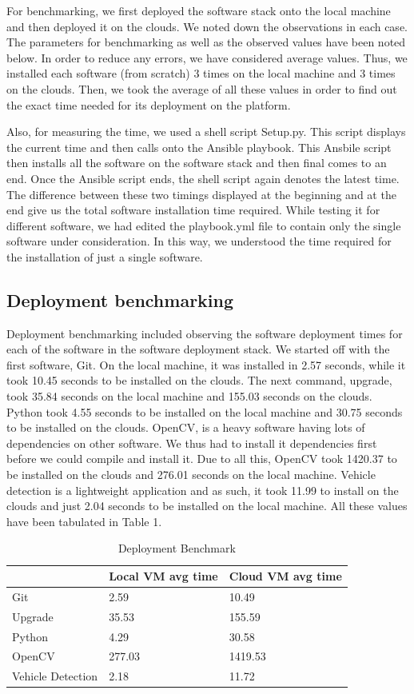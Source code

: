 \documentclass[9pt,twocolumn,twoside]{../../styles/osajnl}
\begin{document}
For benchmarking, we first deployed the software stack onto the local
machine and then deployed it on the clouds.  We noted down the
observations in each case.  The parameters for benchmarking as well as
the observed values have been noted below.  In order to reduce any
errors, we have considered average values.  Thus, we installed each
software (from scratch) 3 times on the local machine and 3 times on
the clouds.  Then, we took the average of all these values in order to
find out the exact time needed for its deployment on the platform.

Also, for measuring the time, we used a shell script Setup.py.  This script displays the current time and then calls onto the Ansible playbook.  This Ansbile script then installs all the software on the software stack and then final comes to an end.  Once the Ansible script ends, the shell script again denotes the latest time.  The difference between these two timings displayed at the beginning and at the end give us the total software installation time required.  While testing it for different software, we had edited the playbook.yml file to contain only the single software under consideration.  In this way, we understood the time required for the installation of just a single software.  

\subsection{Deployment benchmarking}
Deployment benchmarking included observing the software deployment
times for each of the software in the software deployment stack.  We
started off with the first software, Git.  On the local machine, it
was installed in 2.57 seconds, while it took 10.45 seconds to be
installed on the clouds.  The next command, upgrade, took 35.84
seconds on the local machine and 155.03 seconds on the clouds.  Python
took 4.55 seconds to be installed on the local machine and 30.75
seconds to be installed on the clouds.  OpenCV, is a heavy software
having lots of dependencies on other software.  We thus had to
install it dependencies first before we could compile and install it.
Due to all this, OpenCV took 1420.37 to be installed on the clouds
and 276.01 seconds on the local machine.  Vehicle detection is a
lightweight application and as such, it took 11.99 to install on the
clouds and just 2.04 seconds to be installed on the local machine.
All these values have been tabulated in Table 1.

\begin{table}[]
\centering
\caption{Deployment Benchmark}
\label{Table 1}
\begin{tabular}{|l|l|l|}
\hline
 & Local VM avg time & Cloud VM avg time \\ \hline
Git & 2.59 & 10.49 \\ \hline
Upgrade & 35.53 & 155.59 \\ \hline
Python & 4.29 & 30.58 \\ \hline
OpenCV & 277.03 & 1419.53 \\ \hline
Vehicle Detection & 2.18 & 11.72 \\ \hline
\end{tabular}
\end{table}
\end{document}
